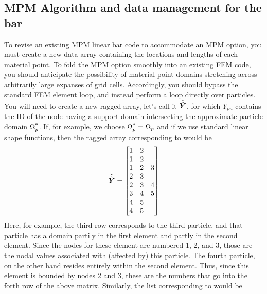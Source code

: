 \subsection{MPM Algorithm and data management for the \oneD bar}

To revise an existing MPM linear bar code to accommodate an MPM option, you must create a new data array containing the locations and lengths of each material point. To fold the MPM option smoothly into an existing FEM code, you should anticipate the possibility of material point domains stretching across arbitrarily large expanses of grid cells. Accordingly, you should bypass the standard FEM element loop, and instead perform a loop directly over particles. You will need to create a new ragged array, let's call it $\hat{\hat{\bm{Y}}}$, for which $Y_{pn}$ contains the ID of the \nth node having a support domain intersecting the approximate particle domain $\Omega_p^{\text{*}}$. If, for example, we choose $\Omega_p^{\text{*}}=\Omega_p$ and if we use standard linear shape functions, then the ragged array corresponding to  would be 
\begin{equation}
  \hat{\hat{\bm{Y}}}=\begin{bmatrix}1 & 2     \\ 
                            1 & 2     \\
                            1 & 2 & 3 \\
                            2 & 3     \\
                            2 & 3 & 4 \\
                            3 & 4 & 5 \\
                            4 & 5 \\
                            4 & 5
             \end{bmatrix}
\end{equation}
Here, for example, the third row corresponds to the third particle, and that particle has a domain partily in the first element and partly in the second element. Since the nodes for these element are numbered 1, 2, and 3, those are the nodal values associated with (\ie affected by) this particle. The fourth particle, on the other hand resides entirely within the second element. Thus, since this element is bounded by nodes 2 and 3, these are the numbers that go into the forth row of the above matrix.  Similarly, the list corresponding to  would be 
